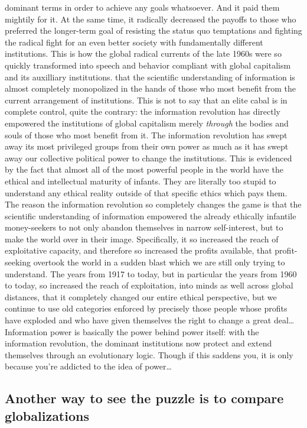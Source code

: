 \documentclass[12pt,book]{article}
\begin{document}
dominant terms in order to achieve any goals whatsoever. And it paid
them mightily for it. At the same time, it radically decreased the
payoffs to those who preferred the longer-term goal of resisting the
status quo temptations and fighting the radical fight for an even better
society with fundamentally different institutions. This is how the
global radical currents of the late 1960s were so quickly transformed
into speech and behavior compliant with global capitalism and its
auxilliary institutions. that the scientific understanding of
information is almost completely monopolized in the hands of those who
most benefit from the current arrangement of institutions. This is not
to say that an elite cabal is in complete control, quite the contrary:
the information revolution has directly empowered the institutions of
global capitalism merely \emph{through} the bodies and souls of those
who most benefit from it. The information revolution has swept away its
most privileged groups from their own power as much as it has swept away
our collective political power to change the institutions. This is
evidenced by the fact that almost all of the most powerful people in the
world have the ethical and intellectual maturity of infants. They are
literally too stupid to understand any ethical reality outside of that
specific ethics which pays them. The reason the information revolution
so completely changes the game is that the scientific understanding of
information empowered the already ethically infantile money-seekers to
not only abandon themselves in narrow self-interest, but to make the
world over in their image. Specifically, it so increased the reach of
exploitative capacity, and therefore so increased the profits available,
that profit-seeking overtook the world in a sudden blast which we are
still only trying to understand. The years from 1917 to today, but in
particular the years from 1960 to today, so increased the reach of
exploitation, into minds as well across global distances, that it
completely changed our entire ethical perspective, but we continue to
use old categories enforced by precisely those people whose profits have
exploded and who have given themselves the right to change a great
deal\ldots{} Information power is basically the power behind power
itself: with the information revolution, the dominant institutions now
protect and extend themselves through an evolutionary logic. Though if
this saddens you, it is only because you're addicted to the idea of
power\ldots{}

\subsection{Another way to see the puzzle is to compare
globalizations}\label{another-way-to-see-the-puzzle-is-to-compare-globalizations}
\end{document}
